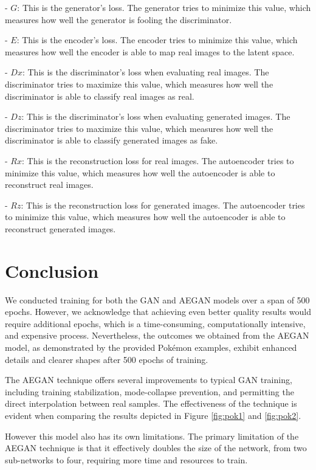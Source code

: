 \documentclass[letterpaper]{article} %
\begin{document}
- $G$: This is the generator's loss. The generator tries to minimize this value, which measures how well the generator is fooling the discriminator. 

- $E$: This is the encoder's loss. The encoder tries to minimize this value, which measures how well the encoder is able to map real images to the latent space.

- $Dx$: This is the discriminator's loss when evaluating real images. The discriminator tries to maximize this value, which measures how well the discriminator is able to classify real images as real.

- $Dz$: This is the discriminator's loss when evaluating generated images. The discriminator tries to maximize this value, which measures how well the discriminator is able to classify generated images as fake.

- $Rx$: This is the reconstruction loss for real images. The autoencoder tries to minimize this value, which measures how well the autoencoder is able to reconstruct real images.

- $Rz$: This is the reconstruction loss for generated images. The autoencoder tries to minimize this value, which measures how well the autoencoder is able to reconstruct generated images.

\section{Conclusion}

We conducted training for both the GAN and AEGAN models over a span of 500 epochs. However, we acknowledge that achieving even better quality results would require additional epochs, which is a time-consuming, computationally intensive, and expensive process. Nevertheless, the outcomes we obtained from the AEGAN model, as demonstrated by the provided Pokémon examples, exhibit enhanced details and clearer shapes after 500 epochs of training.

The AEGAN technique offers several improvements to typical GAN training, including training stabilization, mode-collapse prevention, and permitting the direct interpolation between real samples. The effectiveness of the technique is evident when comparing the results depicted in Figure \ref{fig:pok1} and \ref{fig:pok2}. 

However this model also has its own limitations. The primary limitation of the AEGAN technique is that it effectively doubles the size of the network, from two sub-networks to four, requiring more time and resources to train. 
\end{document}
